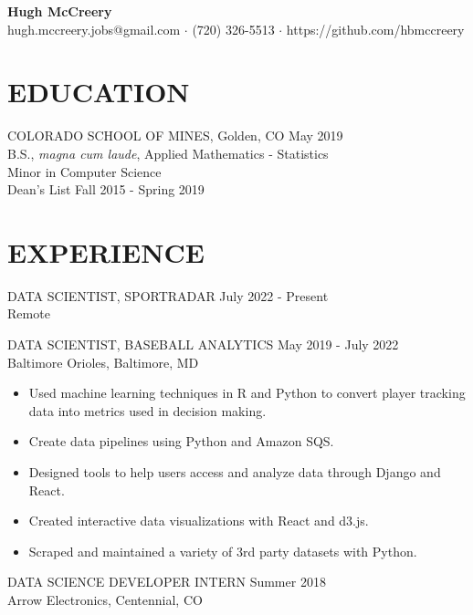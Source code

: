 \documentclass[11pt]{res} %
\begin{document}
 
	\begin{center}
 		\textbf{\LARGE Hugh McCreery} \\
 		hugh.mccreery.jobs@gmail.com $\cdot$ (720) 326-5513 $\cdot$ https://github.com/hbmccreery
	\end{center}
\vspace{-0.6in}
\begin{resume}
\hrulefill
\vspace{-0.2in}                                  
\section{EDUCATION} 
 \noindent COLORADO SCHOOL OF MINES, Golden, CO \hfill May 2019 \\
B.S., \textit{magna cum laude}, Applied Mathematics - Statistics\\
Minor in Computer Science \\
Dean's List \hfill Fall 2015 - Spring 2019 \\
\vspace{-0.1in}
\hrulefill
\vspace{-0.1in}  
\section{EXPERIENCE} 
DATA SCIENTIST, SPORTRADAR \hfill July 2022 - Present \\
Remote

DATA SCIENTIST, BASEBALL ANALYTICS \hfill May 2019  - July 2022	\\
Baltimore Orioles, Baltimore, MD

\begin{itemize}
	\item Used machine learning techniques in R and Python to convert player tracking data into metrics used in decision making.
	\item Create data pipelines using Python and Amazon SQS.
	\item Designed tools to help users access and analyze data through Django and React.
	\item Created interactive data visualizations with React and d3.js.
	\item Scraped and maintained a variety of 3rd party datasets with Python.
\end{itemize}
\vspace{-0.15in}  
DATA SCIENCE DEVELOPER INTERN \hfill Summer 2018 \\
Arrow Electronics, Centennial, CO


\end{resume}
\end{document}

